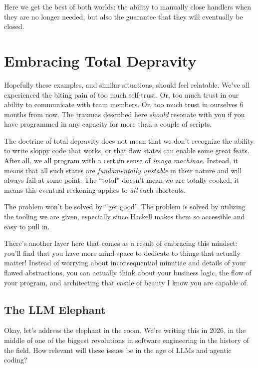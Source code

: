 \documentclass[]{article}
\begin{document}
Here we get the best of both worlds: the ability to manually close handlers when
they are no longer needed, but also the guarantee that they will eventually be
closed.

\section{Embracing Total Depravity}\label{embracing-total-depravity}

Hopefully these examples, and similar situations, should feel relatable. We've
all experienced the biting pain of too much self-trust. Or, too much trust in
our ability to communicate with team members. Or, too much trust in ourselves 6
months from now. The traumas described here \emph{should} resonate with you if
you have programmed in any capacity for more than a couple of scripts.

The doctrine of total depravity does not mean that we don't recognize the
ability to write sloppy code that works, or that flow states can enable some
great feats. After all, we all program with a certain sense of \emph{imago
machinae}. Instead, it means that all such states are \emph{fundamentally
unstable} in their nature and will always fail at some point. The ``total''
doesn't mean we are totally cooked, it means this eventual reckoning applies to
\emph{all} such shortcuts.

The problem won't be solved by ``get good''. The problem is solved by utilizing
the tooling we are given, especially since Haskell makes them so accessible and
easy to pull in.

There's another layer here that comes as a result of embracing this mindset:
you'll find that you have more mind-space to dedicate to things that actually
matter! Instead of worrying about inconsequential minutiae and details of your
flawed abstractions, you can actually think about your business logic, the flow
of your program, and architecting that castle of beauty I know you are capable
of.

\subsection{The LLM Elephant}\label{the-llm-elephant}

Okay, let's address the elephant in the room. We're writing this in 2026, in the
middle of one of the biggest revolutions in software engineering in the history
of the field. How relevant will these issues be in the age of LLMs and agentic
coding?
\end{document}
